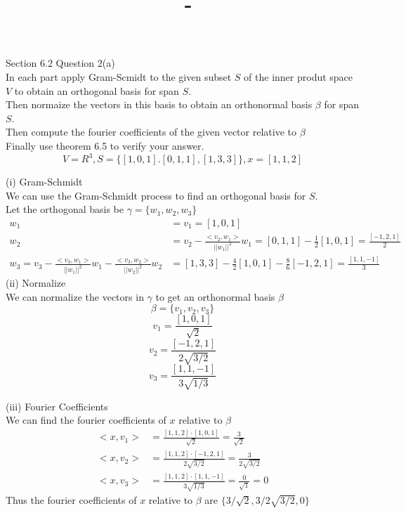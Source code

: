 \documentclass[answers,12pt,addpoints]{exam}
\author{\name}
\title{\course \ - \assignment}
\begin{document}
\maketitle

\begin{questions}
    \question Section 6.2 Question 2(a)\\
    In each part apply Gram-Scmidt to the given subset $S$ of the inner produt space $V$ to obtain an orthogonal basis for span $S$.\\
    Then normaize the vectors in this basis to obtain an orthonormal basis $\beta$ for span $S$.\\
    Then compute the fourier coefficients of the given vector relative to $\beta$\\
    Finally use theorem 6.5 to verify your answer.\\
    $$ V = R^3, S = \{[1,0,1].[0,1,1],[1,3,3]\}, x = [1,1,2]$$

    \begin{solution}
        (i) Gram-Schmidt\\
        We can use the Gram-Schmidt process to find an orthogonal basis for $S$.\\
        Let the orthogonal basis be $\gamma = \{w_1,w_2,w_3\}$\\
        \begin{align*}
            w_1 &= v_1 = [1,0,1]\\
            w_2 &= v_2 - \frac{<v_2,w_1>}{||w_1||^2}w_1 = [0,1,1] - \frac{1}{2}[1,0,1] = \frac{[-1,2,1]}{2}\\
            w_3 = v_3 - \frac{<v_3,w_1>}{||w_1||^2}w_1 - \frac{<v_3,w_2>}{||w_2||^2}w_2 &= [1,3,3] - \frac{4}{2}[1,0,1] - \frac{8}{6}[-1,2,1] = \frac{[1,1,-1]}{3}
        \end{align*}
        (ii) Normalize\\
        We can normalize the vectors in $\gamma$ to get an orthonormal basis $\beta$\\
        $$\beta = \{v_1,v_2,v_3\}$$
        $$v_1 = \frac{[1,0,1]}{\sqrt{2}}$$
        $$v_2 = \frac{[-1,2,1]}{2\sqrt{3/2}}$$
        $$v_3 = \frac{[1,1,-1]}{3\sqrt{1/3}}$$

        (iii) Fourier Coefficients\\
        We can find the fourier coefficients of $x$ relative to $\beta$\\
        \begin{align*}
            <x,v_1> &= \frac{[1,1,2]\cdot[1,0,1]}{\sqrt{2}} = \frac{3}{\sqrt{2}}\\
            <x,v_2> &= \frac{[1,1,2]\cdot[-1,2,1]}{2\sqrt{3/2}} = \frac{3}{2\sqrt{3/2}}\\
            <x,v_3> &= \frac{[1,1,2]\cdot[1,1,-1]}{3\sqrt{1/3}} = \frac{0}{\sqrt{1}} = 0
        \end{align*}
        Thus the fourier coefficients of $x$ relative to $\beta$ are $\{3/\sqrt{2},3/2\sqrt{3/2},0\}$\\


\end{solution}
\end{questions}
\end{document}
